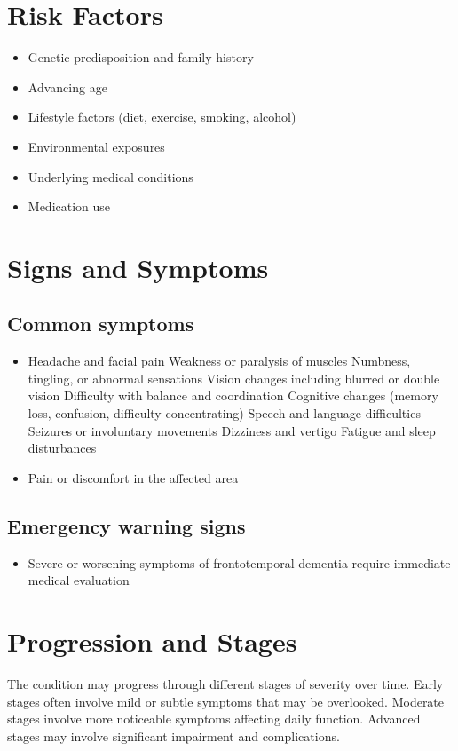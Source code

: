 \section{Risk Factors}
\begin{itemize}[noitemsep]
  \item Genetic predisposition and family history
  \item Advancing age
  \item Lifestyle factors (diet, exercise, smoking, alcohol)
  \item Environmental exposures
  \item Underlying medical conditions
  \item Medication use
\end{itemize}
\section{Signs and Symptoms}

\subsection{Common symptoms}
\begin{itemize}[noitemsep]
  \item Headache and facial pain Weakness or paralysis of muscles Numbness, tingling, or abnormal sensations Vision changes including blurred or double vision Difficulty with balance and coordination Cognitive changes (memory loss, confusion, difficulty concentrating) Speech and language difficulties Seizures or involuntary movements Dizziness and vertigo Fatigue and sleep disturbances
  \item Pain or discomfort in the affected area
  \end{itemize}

\subsection{Emergency warning signs}
\begin{itemize}[noitemsep]
  \item Severe or worsening symptoms of frontotemporal dementia require immediate medical evaluation
\end{itemize}
\section{Progression and Stages}
The condition may progress through different stages of severity over time. Early stages often involve mild or subtle symptoms that may be overlooked. Moderate stages involve more noticeable symptoms affecting daily function. Advanced stages may involve significant impairment and complications.
